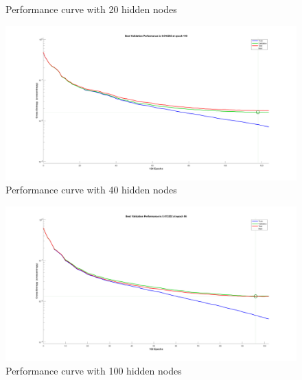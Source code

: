 \documentclass{article}
\begin{document}
{{\begin{figure}[H]
            \caption{Performance curve with 20 hidden nodes}
        \end{figure}
        \begin{figure}[H]
            \centering
            \includegraphics[width = 1.0\linewidth]{src1/Performance_40.png}
            \caption{Performance curve with 40 hidden nodes}
        \end{figure}
        \begin{figure}[H]
            \centering
            \includegraphics[width = 1.0\linewidth]{src1/Performance_100.png}
            \caption{Performance curve with 100 hidden nodes}
        \end{figure}
    }

}
\end{document}
